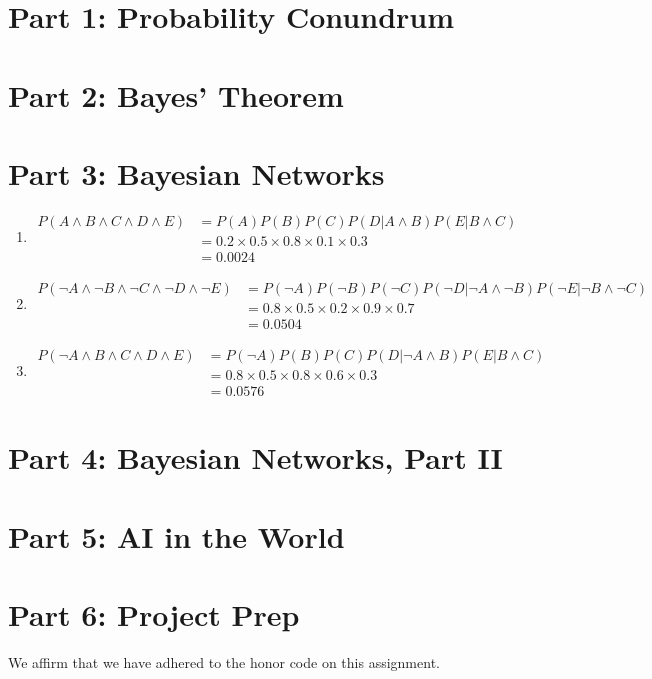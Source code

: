 \documentclass[11pt]{amsart}
\newcommand{\honor}{We affirm that we have adhered to the honor code on this assignment.}
\begin{document}
\maketitle

\section*{Part 1: Probability Conundrum}

\section*{Part 2: Bayes' Theorem}

\section*{Part 3: Bayesian Networks}

\begin{enumerate}

\item
\begin{align*}
P(A \wedge B \wedge C \wedge D \wedge E)
	&= P(A) P(B) P(C) P(D | A \wedge B) P(E | B \wedge C) \\
	&= 0.2 \times 0.5 \times 0.8 \times 0.1 \times 0.3 \\
	&= 0.0024
\end{align*}

\item
\begin{align*}
P(\neg A \wedge \neg B \wedge \neg C \wedge \neg D \wedge \neg E)
	&= P(\neg A) P(\neg B) P(\neg C) P(\neg D | \neg A \wedge \neg B) P(\neg E | \neg B \wedge \neg C) \\
	&= 0.8 \times 0.5 \times 0.2 \times 0.9 \times 0.7 \\
	&= 0.0504
\end{align*}

\item
\begin{align*}
P(\neg A \wedge B \wedge C \wedge D \wedge E)
	&= P(\neg A) P(B) P(C) P(D | \neg A \wedge B) P(E | B \wedge C) \\
	&= 0.8 \times 0.5 \times 0.8 \times 0.6 \times 0.3 \\
	&= 0.0576
\end{align*}

\end{enumerate}

\section*{Part 4: Bayesian Networks, Part II}

\section*{Part 5: AI in the World}

\section*{Part 6: Project Prep}

\honor
\end{document}
